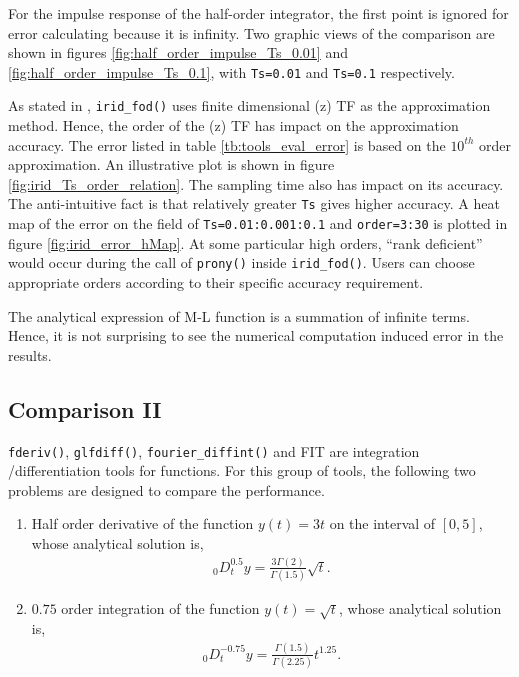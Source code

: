 \documentclass[11pt]{tCON2e}
\theoremstyle{plain}\newtheorem{theorem}{Theorem}
\theoremstyle{definition}
\theoremstyle{remark}
\begin{document}
For the impulse response of the half-order integrator, the first point is ignored for error calculating because it is infinity. Two graphic views of the comparison are shown in figures \ref{fig:half_order_impulse_Ts_0.01} and \ref{fig:half_order_impulse_Ts_0.1}, with {\tt Ts=0.01} and {\tt Ts=0.1} respectively.


As stated in \cite{ref:Chen_irid_fod}, {\tt irid\_fod()} uses finite dimensional (z) TF as the approximation method. Hence, the order of the (z) TF has impact on the approximation accuracy. The error listed in table \ref{tb:tools_eval_error} is based on the $10^{th}$ order approximation. An illustrative plot is shown in figure \ref{fig:irid_Ts_order_relation}. The sampling time also has impact on its accuracy. The anti-intuitive fact is that relatively greater {\tt Ts} gives higher accuracy. A heat map of the error on the field of {\tt Ts=0.01:0.001:0.1} and {\tt order=3:30} is plotted in figure \ref{fig:irid_error_hMap}. At some particular high orders, ``rank deficient'' would occur during the call of {\tt prony()} inside {\tt irid\_fod()}. Users can choose appropriate orders according to their specific accuracy requirement.




The analytical expression of M-L function is a summation of infinite terms. Hence, it is not surprising to see the numerical computation induced error in the results.




\subsection{Comparison II}

{\tt fderiv()}, {\tt glfdiff()}, {\tt fourier\_diffint()} and FIT are integration /differentiation tools for functions. For this group of tools, the following two problems are designed to compare the performance.
\begin{enumerate}
    \item Half order derivative of the function $y(t) = 3t$ on the interval of $[0,5]$, whose analytical solution is,
    \begin{eqnarray}
    {_0}D_t^{0.5}y = \frac{3\Gamma(2)}{\Gamma(1.5)}\sqrt{t}.
    \end{eqnarray}
    \item $0.75$ order integration of the function $y(t) = \sqrt{t}$, whose analytical solution is,
    \begin{eqnarray}
    {_0}D_t^{-0.75}y = \frac{\Gamma(1.5)}{\Gamma(2.25)}t^{1.25}.
    \end{eqnarray}
\end{enumerate}
\end{document}
